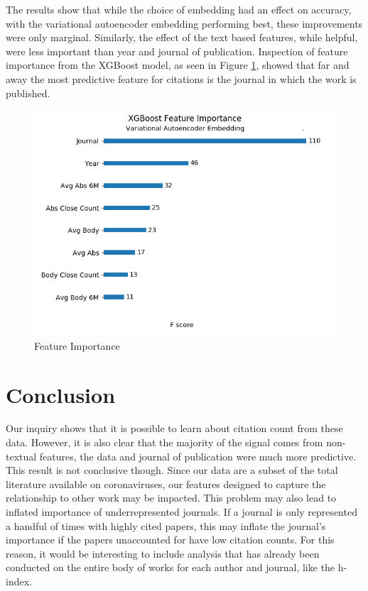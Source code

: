\documentclass{article} %
\begin{document}
The results show that while the choice of embedding had an effect on accuracy, with the variational autoencoder embedding performing best, these improvements were only marginal. Similarly, the effect of the text based features, while helpful, were less important than year and journal of publication. Inspection of feature importance from the XGBoost model, as seen in Figure \ref{feature_imp}, showed that far and away the most predictive feature for citations is the journal in which the work is published.


\begin{figure}[h]
\begin{center}
  \includegraphics[scale=0.6]{../figures/xgboost_feature_importance.png}
\end{center}
\caption{Feature Importance}
\label{feature_imp}
\end{figure}



\section{Conclusion}
\label{conclusion}

Our inquiry shows that it is possible to learn about citation count from these data. However, it is also  clear that the majority of the signal comes from non-textual features, the data and journal of publication were much more predictive. This result is not conclusive though. Since our data are a subset of the total literature available on coronaviruses, our features designed to capture the relationship to other work may be impacted. This problem may also lead to inflated importance of underrepresented journals. If a journal is only represented a handful of times with highly cited papers, this may inflate the journal's importance if the papers unaccounted for have low citation counts. For this reason, it would be interesting to include analysis that has already been conducted on the entire body of works for each author and journal, like the h-index.
\end{document}
